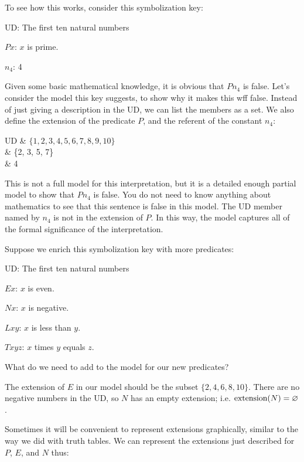 To see how this works, consider this symbolization key:
\begin{ekey}
\item{UD:} The first ten natural numbers
\item{$Px$:} $x$ is prime.
\item{$n_{4}$}: 4
\end{ekey}

Given some basic mathematical knowledge, it is obvious that $Pn_{4}$ is false. Let's consider the model this key suggests, to show why it makes this wff false. Instead of just giving a description in the UD, we can list the members as a set. We also define the extension of the predicate $P$, and the referent of the constant $n_{4}$:

\begin{partialmodel}
	UD & $\{1, 2, 3, 4, 5, 6, 7, 8, 9, 10\}$\\
	 & \{2, 3, 5, 7\}\\
	 & 4
\end{partialmodel}

This is not a full model for this interpretation, but it is a detailed enough partial model to show that $Pn_{4}$ is false. You do not need to know anything about mathematics to see that this sentence is false in this model. The UD member named by $n_{4}$ is not in the extension of $P$. In this way, the model captures all of the formal significance of the interpretation.

Suppose we enrich this symbolization key with more predicates:
\label{10UD}
\begin{ekey}
\item{UD:} The first ten natural numbers
\item{$Ex$:} $x$ is even.
\item{$Nx$:} $x$ is negative.
\item{$Lxy$:} $x$ is less than $y$.
\item{$Txyz$:} $x$ times $y$ equals $z$.
\end{ekey}
What do we need to add to the model for our new predicates?

The extension of $E$ in our model should be the subset $\{2, 4, 6, 8, 10\}$. There are no negative numbers in the UD, so $N$ has an empty extension; i.e. $\mbox{extension}(N)=\varnothing$.

Sometimes it will be convenient to represent extensions graphically, similar to the way we did with truth tables. We can represent the extensions just described for $P$, $E$, and $N$ thus:

